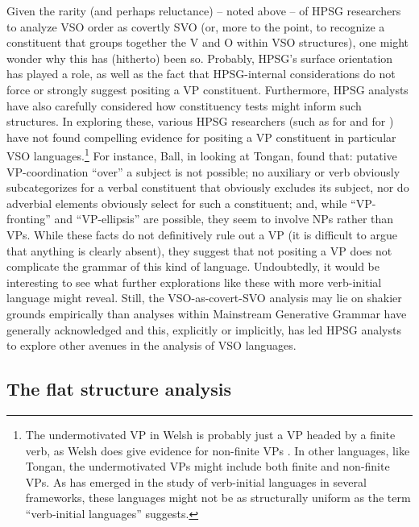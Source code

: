 \documentclass[output=paper
	        ,collection
	        ,collectionchapter
 	        ,biblatex
                ,babelshorthands
                ,newtxmath
                ,draftmode
                ,colorlinks, citecolor=brown
]{langscibook}
\begin{document}
Given the rarity (and perhaps reluctance) -- noted above -- of HPSG researchers to analyze VSO order as covertly SVO (or, more to the point, to recognize a constituent that groups together the V and O within VSO structures), one might wonder why this has (hitherto) been so. Probably, HPSG's surface orientation has played a role, as well as the fact that HPSG-internal considerations do not force or strongly suggest positing a VP constituent. Furthermore, HPSG analysts have also carefully considered how constituency tests might inform such structures. In exploring these, various HPSG researchers (such as \citealt{borsley06} for  and \citealt[Chapter 3]{ball08thesis} for ) have not found compelling evidence for positing a VP constituent in particular VSO languages.\footnote{The undermotivated VP in Welsh is probably just a VP headed by a finite verb, as Welsh does give evidence for non-finite VPs \citep{BTW07}. In other languages, like Tongan, the undermotivated VPs might include both finite and non-finite VPs. As has emerged in the study of verb-initial languages in several frameworks, these languages might not be as structurally uniform as the term ``verb-initial languages'' suggests.} For instance, Ball, in looking at Tongan, found that: putative VP-coordination ``over'' a subject is not possible; no auxiliary or verb obviously subcategorizes for a verbal constituent that obviously excludes its subject, nor do adverbial elements obviously select for such a constituent; and, while ``VP-fronting'' and ``VP-ellipsis'' are possible, they seem to involve NPs rather than VPs. While these facts do not definitively rule out a VP (it is difficult to argue that anything is clearly absent), they suggest that not positing a VP does not complicate the grammar of this kind of language. Undoubtedly, it would be interesting to see what further explorations like these with more verb-initial language might reveal. Still, the VSO-as-covert-SVO analysis may lie on shakier grounds empirically than analyses within Mainstream Generative Grammar have generally acknowledged and this, explicitly or implicitly, has led HPSG analysts to explore other avenues in the analysis of VSO languages.           

\subsection{The flat structure analysis}
\label{understudied-sec-flat}
\end{document}
